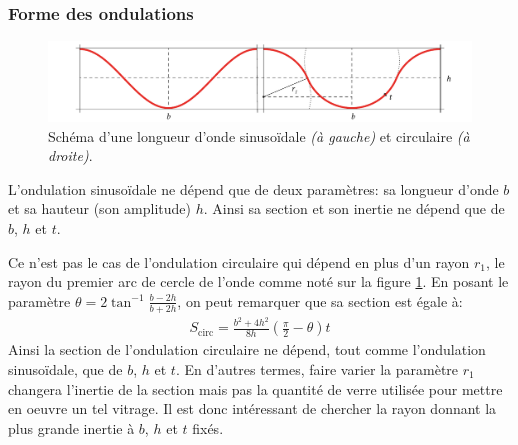 \documentclass[11pt,titlepage]{article}
\begin{document}
\subsubsection{Forme des ondulations}
\begin{figure}[H]
    \centering
    \includegraphics[width=\linewidth]{img/ondul/circ.pdf}
    \caption{Schéma d'une longueur d'onde sinusoïdale \textit{(à gauche)} et circulaire \textit{(à droite)}.}
    \label{fig:ondcirc}
\end{figure}
L'ondulation sinusoïdale ne dépend que de deux paramètres: sa longueur d'onde $b$ et sa hauteur (son amplitude) $h$. Ainsi sa section et son inertie ne dépend que de $b$, $h$ et $t$.

Ce n'est pas le cas de l'ondulation circulaire qui dépend en plus d'un rayon $r_1$, le rayon du premier arc de cercle de l'onde comme noté sur la figure \ref{fig:ondcirc}. En posant le paramètre $\theta = 2 \tan^{-1} \frac{b-2h}{b+2h}$, on peut remarquer que sa section est égale à:
\begin{align}
    S_{\text{circ}} = \frac{b^2+4h^2}{8h} \left ( \frac{\pi}{2} - \theta\right )t
\end{align}
Ainsi la section de l'ondulation circulaire ne dépend, tout comme l'ondulation sinusoïdale, que de $b$, $h$ et $t$. En d'autres termes, faire varier la paramètre $r_1$ changera l'inertie de la section mais pas la quantité de verre utilisée pour mettre en oeuvre un tel vitrage.  Il est donc intéressant de chercher la rayon donnant la plus grande inertie à $b$, $h$ et $t$ fixés.
\end{document}
